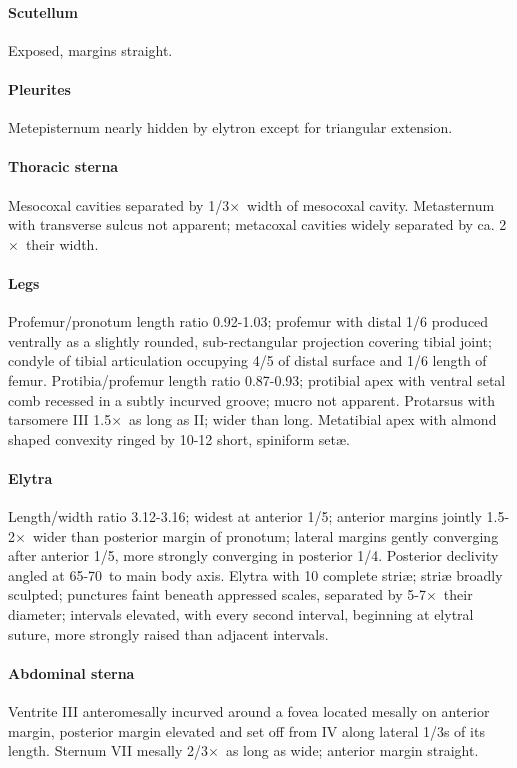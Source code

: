 \documentclass[fleqn,10pt,lineno]{wlpeerj} %
\newcommand{\td}{\textdegree~}
\newcommand{\x}{$\times$~}
\begin{document}
			\paragraph{Scutellum}
				Exposed, margins straight.
			\paragraph{Pleurites}
				Metepisternum nearly hidden by elytron except for triangular extension.
			\paragraph{Thoracic sterna} 
				Mesocoxal cavities separated by 1/3\x width of mesocoxal cavity. 
				Metasternum with transverse sulcus not apparent; metacoxal cavities widely separated by ca. 2\x their width.
			\paragraph{Legs}
				Profemur/pronotum length ratio 0.92-1.03; profemur with distal 1/6 produced ventrally as a slightly rounded, sub-rectangular projection covering tibial joint; condyle of tibial articulation occupying 4/5 of distal surface and 1/6 length of femur. 
				Protibia/profemur length ratio 0.87-0.93; protibial apex with ventral setal comb recessed in a subtly incurved groove; mucro not apparent. 
				Protarsus with tarsomere III 1.5\x as long as II; wider than long. 
				Metatibial apex with almond shaped convexity ringed by 10-12 short, spiniform set{\ae}.
			\paragraph{Elytra}
				Length/width ratio 3.12-3.16; widest at anterior 1/5; anterior margins jointly 1.5-2\x wider than posterior margin of pronotum; lateral margins gently converging after anterior 1/5, more strongly converging in posterior 1/4. 
				Posterior declivity angled at 65-70\td to main body axis. Elytra with 10 complete stri{\ae}; stri{\ae} broadly sculpted; punctures faint beneath appressed scales, separated by 5-7\x their diameter; intervals elevated, with every second interval, beginning at elytral suture, more strongly raised than adjacent intervals.
			\paragraph{Abdominal sterna}
				Ventrite III anteromesally incurved around a fovea located mesally on anterior margin, posterior margin elevated and set off from IV along lateral 1/3s of its length. 
				Sternum VII mesally 2/3\x as long as wide; anterior margin straight.
\end{document}
